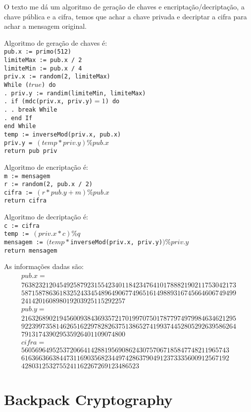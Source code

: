 \documentclass{article}
\begin{document}
O texto me dá um algoritmo de geração de chaves e
encriptação/decriptação, a chave pública e a cifra,
temos que achar a chave privada e
decriptar a cifra para achar a mensagem original.

Algoritmo de geração de chaves é:
\texttt{ \\
    pub.x := primo(512) \\
    limiteMax := pub.x / 2 \\
    limiteMin := pub.x / 4 \\
    priv.x := random(2, limiteMax) \\
    While ($true$) do \\
    . priv.y := randim(limiteMin, limiteMax) \\
    . if (\(\)mdc(priv.x, priv.y)\( = 1\)) do \\
    . . break While \\
    . end If \\
    end While \\
    temp := inverseMod(priv.x, pub.x) \\
    priv.y = \((temp * priv.y) \% pub.x\) \\
    return pub priv
}

Algoritmo de encriptação é:
\texttt{ \\
    m := mensagem \\
    r := random(2, pub.x / 2) \\
    cifra := \((r * pub.y + m) \% pub.x\) \\
    return cifra
}

Algoritmo de decriptação é:
\texttt{ \\
    c := cifra \\
    temp := \((priv.x * c) \% q\) \\
    mensagem := \((temp * \)inverseMod(priv.x, priv.y)\() \% priv.y\) \\
    return mensagem
}

As informações dadas são:
\begin{gather*}
    pub.x = \\
    7638232120454925879231554234011
    8423476410178882190211753042173 \\
    5871587863618325243345489649067
    7496516149889316745664606749499 \\
    241420160898019203925115292257 \\
    pub.y = \\
    2163268902194560093843693572170
    1997075017877974979984634621295 \\
    9223997358146265162297828263751
    3865274199374452805292639586264 \\
    791317439029535926401109074800 \\
    cifra = \\
    560569649525372066414288195690
    862430757067185847748211965743 \\
    616366366384473116903568234497
    428637904912373335600912567192 \\
    428031253275524116226726912348
    6523
\end{gather*}

\section{Backpack Cryptography}
\end{document}

